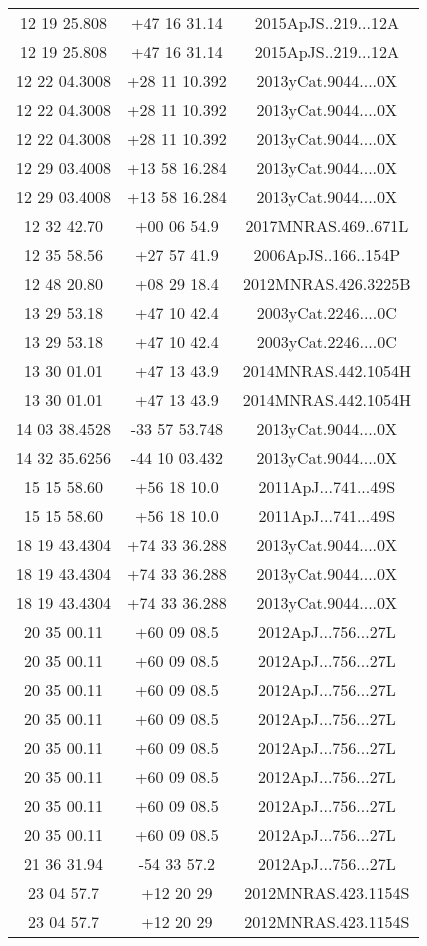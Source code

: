 \begin{table}
\begin{tabular}{ccc}
12 19 25.808 & +47 16 31.14 & 2015ApJS..219...12A \\
12 19 25.808 & +47 16 31.14 & 2015ApJS..219...12A \\
12 22 04.3008 & +28 11 10.392 & 2013yCat.9044....0X \\
12 22 04.3008 & +28 11 10.392 & 2013yCat.9044....0X \\
12 22 04.3008 & +28 11 10.392 & 2013yCat.9044....0X \\
12 29 03.4008 & +13 58 16.284 & 2013yCat.9044....0X \\
12 29 03.4008 & +13 58 16.284 & 2013yCat.9044....0X \\
12 32 42.70 & +00 06 54.9 & 2017MNRAS.469..671L \\
12 35 58.56 & +27 57 41.9 & 2006ApJS..166..154P \\
12 48 20.80 & +08 29 18.4 & 2012MNRAS.426.3225B \\
13 29 53.18 & +47 10 42.4 & 2003yCat.2246....0C \\
13 29 53.18 & +47 10 42.4 & 2003yCat.2246....0C \\
13 30 01.01 & +47 13 43.9 & 2014MNRAS.442.1054H \\
13 30 01.01 & +47 13 43.9 & 2014MNRAS.442.1054H \\
14 03 38.4528 & -33 57 53.748 & 2013yCat.9044....0X \\
14 32 35.6256 & -44 10 03.432 & 2013yCat.9044....0X \\
15 15 58.60 & +56 18 10.0 & 2011ApJ...741...49S \\
15 15 58.60 & +56 18 10.0 & 2011ApJ...741...49S \\
18 19 43.4304 & +74 33 36.288 & 2013yCat.9044....0X \\
18 19 43.4304 & +74 33 36.288 & 2013yCat.9044....0X \\
18 19 43.4304 & +74 33 36.288 & 2013yCat.9044....0X \\
20 35 00.11 & +60 09 08.5 & 2012ApJ...756...27L \\
20 35 00.11 & +60 09 08.5 & 2012ApJ...756...27L \\
20 35 00.11 & +60 09 08.5 & 2012ApJ...756...27L \\
20 35 00.11 & +60 09 08.5 & 2012ApJ...756...27L \\
20 35 00.11 & +60 09 08.5 & 2012ApJ...756...27L \\
20 35 00.11 & +60 09 08.5 & 2012ApJ...756...27L \\
20 35 00.11 & +60 09 08.5 & 2012ApJ...756...27L \\
20 35 00.11 & +60 09 08.5 & 2012ApJ...756...27L \\
21 36 31.94 & -54 33 57.2 & 2012ApJ...756...27L \\
23 04 57.7 & +12 20 29 & 2012MNRAS.423.1154S \\
23 04 57.7 & +12 20 29 & 2012MNRAS.423.1154S \\
\end{tabular}
\end{table}
